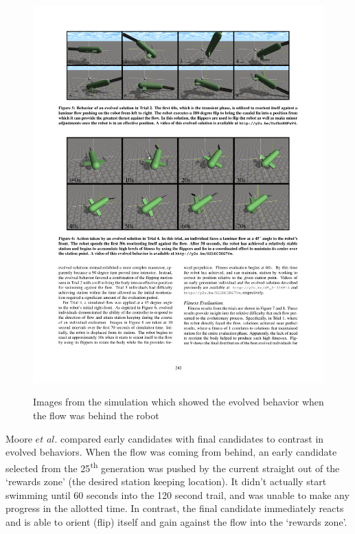 \documentclass{sig-alternate}
\begin{document}
\begin{figure}%
\center
\caption{Images from the simulation which showed the evolved behavior when the flow was behind the robot}

  \includegraphics[scale=1]{sr1}
\label{fig:robot flip}
\end{figure}

  Moore $et$ $al.$ compared early candidates with final candidates to contrast in evolved behaviors. When the flow was coming from behind, an early candidate selected from the 25\textsuperscript{th} generation was pushed by the current straight out of the `rewards zone' (the desired station keeping location). It didn't actually start swimming until 60 seconds into the 120 second trail, and was unable to make any progress in the allotted time. In contrast, the final candidate immediately reacts and is able to orient (flip) itself and gain against the flow into the `rewards zone'. 
\end{document}
